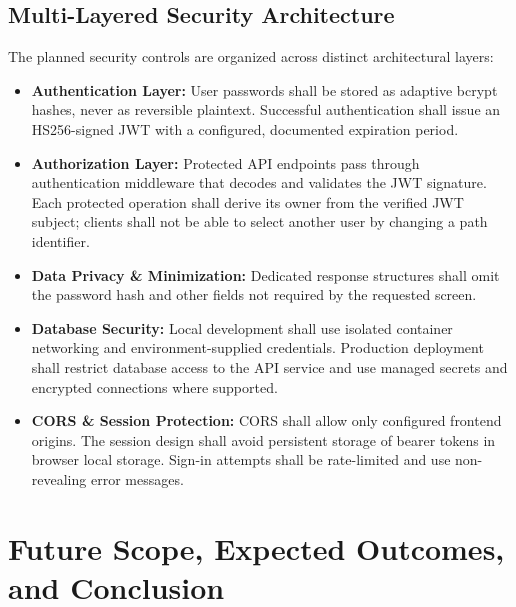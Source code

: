 \documentclass[11pt,a4paper]{report}
\begin{document}
\section{Multi-Layered Security Architecture}
The planned security controls are organized across distinct architectural layers:
\begin{itemize}
  \item \textbf{Authentication Layer:} User passwords shall be stored as adaptive bcrypt hashes, never as reversible plaintext. Successful authentication shall issue an HS256-signed JWT with a configured, documented expiration period.
  \item \textbf{Authorization Layer:} Protected API endpoints pass through authentication middleware that decodes and validates the JWT signature. Each protected operation shall derive its owner from the verified JWT subject; clients shall not be able to select another user by changing a path identifier.
  \item \textbf{Data Privacy \& Minimization:} Dedicated response structures shall omit the password hash and other fields not required by the requested screen.
  \item \textbf{Database Security:} Local development shall use isolated container networking and environment-supplied credentials. Production deployment shall restrict database access to the API service and use managed secrets and encrypted connections where supported.
  \item \textbf{CORS \& Session Protection:} CORS shall allow only configured frontend origins. The session design shall avoid persistent storage of bearer tokens in browser local storage. Sign-in attempts shall be rate-limited and use non-revealing error messages.
\end{itemize}

\chapter{Future Scope, Expected Outcomes, and Conclusion}
\end{document}
